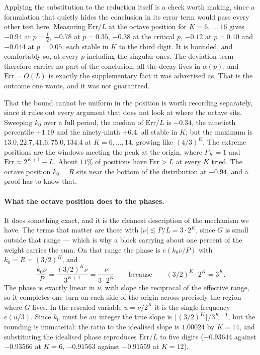 \documentclass[11pt]{article}
\theoremstyle{remark}
\begin{document}
Applying the substitution to the reduction itself is a check worth making, since a formulation that
quietly hides the conclusion in its error term would pass every other test here. Measuring
$\mathrm{Err}/L$ at the octave position for $K=6,\dots,16$ gives $-0.94$ at $p=\tfrac12$, $-0.78$ at
$p=0.35$, $-0.38$ at the critical $p$, $-0.12$ at $p=0.10$ and $-0.044$ at $p=0.05$, each stable in $K$
to the third digit. It is bounded, and comfortably so, at every $p$ including the singular ones. The
deviation term therefore carries no part of the conclusion: all the decay lives in $\alpha(p)$, and
$\mathrm{Err}=O(L)$ is exactly the supplementary fact it was advertised as. That is the outcome one
wants, and it was not guaranteed.

That the bound cannot be uniform in the position is worth recording separately, since it rules out every
argument that does not look at where the octave sits. Sweeping $k_0$ over a full period, the median of
$\mathrm{Err}/L$ is $-0.34$, the ninetieth percentile $+1.19$ and the ninety-ninth $+6.4$, all stable in
$K$; but the maximum is $13.0,22.7,41.6,75.0,134.4$ at $K=6,\dots,14$, growing like $(4/3)^K$. The
extreme positions are the windows meeting the peak at the origin, where $F_K=1$ and
$\mathrm{Err}\approx2^{K+1}-L$. About $11\%$ of positions have $\mathrm{Err}>L$ at every $K$ tried. The
octave position $k_0=R$ sits near the bottom of the distribution at $-0.94$, and a proof has to know
that.

\paragraph{What the octave position does to the phases.} It does something exact, and it is the
cleanest description of the mechanism we have. The terms that matter are those with $|\nu|\lesssim P/L=
3\cdot2^K$, since $G$ is small outside that range --- which is why a block carrying about one percent of
the weight carries the sum. On that range the phase is $e(k_0\nu/P)$ with $k_0=R=(3/2)^K$, and
\[
  \frac{k_0\nu}{P}=\frac{(3/2)^K\nu}{3^{K+1}}=\frac{\nu}{3\cdot2^K}
  \qquad\text{because}\qquad (3/2)^K\cdot2^K=3^K .
\]
The phase is exactly linear in $\nu$, with slope the reciprocal of the effective range, so it completes
one turn on each side of the origin across precisely the region where $G$ lives. In the rescaled
variable $u=\nu/2^K$ it is the single frequency $e(u/3)$. Since $k_0$ must be an integer the true slope
is $\lfloor(3/2)^K\rceil/3^{K+1}$, but the rounding is immaterial: the ratio to the idealised slope is
$1.00024$ by $K=14$, and substituting the idealised phase reproduces $\mathrm{Err}/L$ to five digits
($-0.93644$ against $-0.93566$ at $K=6$, $-0.91563$ against $-0.91559$ at $K=12$).
\end{document}
